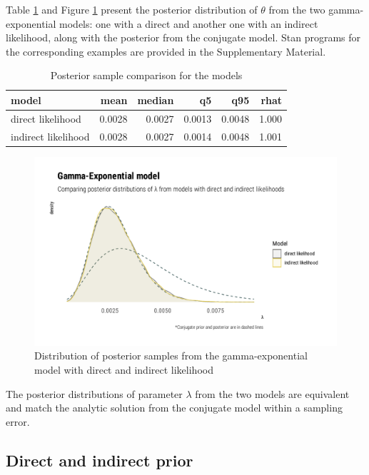 \documentclass[
  12pt,
]{article}
\begin{document}
Table \ref{tab:gexp-likelihood-tab} and Figure \ref{fig:gexp-likelihood-graphs} present the posterior distribution of \(\theta\) from the two gamma-exponential models: one with a direct and another one with an indirect likelihood, along with the posterior from the conjugate model. Stan programs for the corresponding examples are provided in the Supplementary Material.

\begin{table}[!h]

\caption{\label{tab:gexp-likelihood-tab}Posterior sample comparison for the models}
\centering
\begin{tabular}[t]{lrrrrr}
\toprule
model & mean & median & q5 & q95 & rhat\\
\midrule
direct likelihood & 0.0028 & 0.0027 & 0.0013 & 0.0048 & 1.000\\
indirect likelihood & 0.0028 & 0.0027 & 0.0014 & 0.0048 & 1.001\\
\bottomrule
\end{tabular}
\end{table}

\begin{figure}

{\centering \includegraphics[width=0.8\linewidth]{ilbm_article_files/figure-latex/gexp-likelihood-graphs-1} 

}

\caption{Distribution of posterior samples from the gamma-exponential model with direct and indirect likelihood}\label{fig:gexp-likelihood-graphs}
\end{figure}

The posterior distributions of parameter \(\lambda\) from the two models are equivalent and match the analytic solution from the conjugate model within a sampling error.

\hypertarget{direct-and-indirect-prior}{%
\subsection{Direct and indirect prior}\label{direct-and-indirect-prior}}
\end{document}
